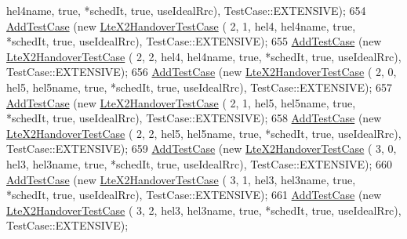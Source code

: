\begin{DoxyCode}
      hel4name, \textcolor{keyword}{true}, *schedIt, \textcolor{keyword}{true},  useIdealRrc), TestCase::EXTENSIVE);
654           \hyperlink{classns3_1_1TestCase_a3718088e3eefd5d6454569d2e0ddd835}{AddTestCase} (\textcolor{keyword}{new} \hyperlink{classLteX2HandoverTestCase}{LteX2HandoverTestCase} (  2,    1,    hel4, 
      hel4name, \textcolor{keyword}{true}, *schedIt, \textcolor{keyword}{true},  useIdealRrc), TestCase::EXTENSIVE);
655           \hyperlink{classns3_1_1TestCase_a3718088e3eefd5d6454569d2e0ddd835}{AddTestCase} (\textcolor{keyword}{new} \hyperlink{classLteX2HandoverTestCase}{LteX2HandoverTestCase} (  2,    2,    hel4, 
      hel4name, \textcolor{keyword}{true}, *schedIt, \textcolor{keyword}{true},  useIdealRrc), TestCase::EXTENSIVE);
656           \hyperlink{classns3_1_1TestCase_a3718088e3eefd5d6454569d2e0ddd835}{AddTestCase} (\textcolor{keyword}{new} \hyperlink{classLteX2HandoverTestCase}{LteX2HandoverTestCase} (  2,    0,    hel5, 
      hel5name, \textcolor{keyword}{true}, *schedIt, \textcolor{keyword}{true},  useIdealRrc), TestCase::EXTENSIVE);
657           \hyperlink{classns3_1_1TestCase_a3718088e3eefd5d6454569d2e0ddd835}{AddTestCase} (\textcolor{keyword}{new} \hyperlink{classLteX2HandoverTestCase}{LteX2HandoverTestCase} (  2,    1,    hel5, 
      hel5name, \textcolor{keyword}{true}, *schedIt, \textcolor{keyword}{true},  useIdealRrc), TestCase::EXTENSIVE);
658           \hyperlink{classns3_1_1TestCase_a3718088e3eefd5d6454569d2e0ddd835}{AddTestCase} (\textcolor{keyword}{new} \hyperlink{classLteX2HandoverTestCase}{LteX2HandoverTestCase} (  2,    2,    hel5, 
      hel5name, \textcolor{keyword}{true}, *schedIt, \textcolor{keyword}{true},  useIdealRrc), TestCase::EXTENSIVE);
659           \hyperlink{classns3_1_1TestCase_a3718088e3eefd5d6454569d2e0ddd835}{AddTestCase} (\textcolor{keyword}{new} \hyperlink{classLteX2HandoverTestCase}{LteX2HandoverTestCase} (  3,    0,    hel3, 
      hel3name, \textcolor{keyword}{true}, *schedIt, \textcolor{keyword}{true},  useIdealRrc), TestCase::EXTENSIVE);
660           \hyperlink{classns3_1_1TestCase_a3718088e3eefd5d6454569d2e0ddd835}{AddTestCase} (\textcolor{keyword}{new} \hyperlink{classLteX2HandoverTestCase}{LteX2HandoverTestCase} (  3,    1,    hel3, 
      hel3name, \textcolor{keyword}{true}, *schedIt, \textcolor{keyword}{true},  useIdealRrc), TestCase::EXTENSIVE);
661           \hyperlink{classns3_1_1TestCase_a3718088e3eefd5d6454569d2e0ddd835}{AddTestCase} (\textcolor{keyword}{new} \hyperlink{classLteX2HandoverTestCase}{LteX2HandoverTestCase} (  3,    2,    hel3, 
      hel3name, \textcolor{keyword}{true}, *schedIt, \textcolor{keyword}{true},  useIdealRrc), TestCase::EXTENSIVE);

\end{DoxyCode}

